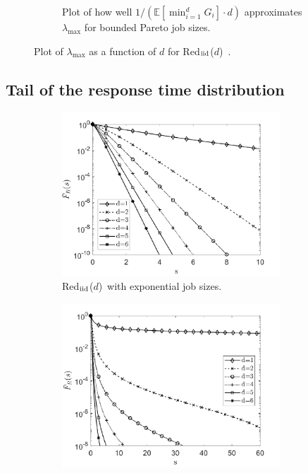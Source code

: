 \documentclass[12pt]{report}
\newcommand{\Redind}{Red$_{\textup{iid}}$($d$)}
\begin{document}
\begin{figure}[t]
\begin{subfigure}{.45\textwidth}
\begin{center}
\caption{Plot of how well $1/(\mathbb{E}[\min_{i=1}^d G_i] \cdot d)$ approximates $\lambda_{\max}$ for bounded Pareto job sizes.}
\label{fig:lam_max_ifo_ind2}
\end{center}
\end{subfigure}
\caption{Plot of $\lambda_{\max}$ as a function of $d$ for \Redind\ .}
\label{fig:lam_max_ifo_ind}
\end{figure}
\subsection{Tail of the response time distribution}
\begin{figure}[t]
\begin{subfigure}{.45\textwidth}
\begin{center}
\includegraphics[width=0.9\textwidth]{figures/Chapter3/tail_expindvard.pdf}
\caption{\Redind\ with exponential job sizes.}
\label{fig:tail_expindvard}
\end{center}
\end{subfigure}
\begin{subfigure}{.45\textwidth}
\begin{center}
\includegraphics[width=0.9\textwidth]{figures/Chapter3/tail_BPindvard.pdf}

\end{center}
\end{subfigure}
\end{figure}
\end{document}
